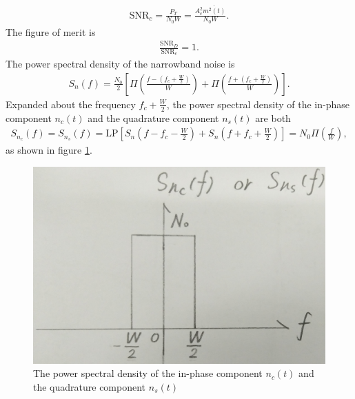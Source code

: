 \documentclass{assignment}
\begin{document}
\begin{sol}
\begin{align}
        \text{SNR}_c=\frac{P_T}{N_0W}=\frac{A_c^2\overline{m^2(t)}}{N_0W}.
    \end{align}
    The figure of merit is
    \begin{align}
        \frac{\text{SNR}_D}{\text{SNR}_c}=1.
    \end{align}
    The power spectral density of the narrowband noise is
    \begin{align}
        S_n(f)=\frac{N_0}{2}\left[\Pi\left(\frac{f-\left(f_c+\frac{W}{2}\right)}{W}\right)+\Pi\left(\frac{f+\left(f_c+\frac{W}{2}\right)}{W}\right)\right].
    \end{align}
    Expanded about the frequency $f_c+\frac{W}{2}$, the power spectral density of the in-phase component $n_c(t)$ and the quadrature component $n_s(t)$ are both
    \begin{align}
        S_{n_c}(f)=S_{n_s}(f)=\text{LP}\left[S_n\left(f-f_c-\frac{W}{2}\right)+S_n\left(f+f_c+\frac{W}{2}\right)\right]=N_0\Pi\left(\frac{f}{W}\right),
    \end{align}
    as shown in figure \ref{P-6-A-2}.
    \begin{figure}[h]
        \centering
        \includegraphics[width=.4\columnwidth]{A-6-P-2.jpg}
        \caption{The power spectral density of the in-phase component $n_c(t)$ and the quadrature component $n_s(t)$}
        \label{P-6-A-2}
    \end{figure}
\end{sol}
\end{document}
